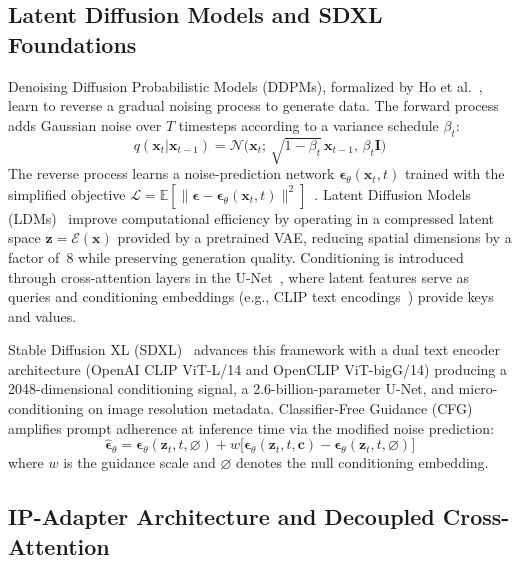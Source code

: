 \documentclass[conference]{IEEEtran}
\newcommand{\sdxl}{SDXL}
\begin{document}
\subsection{Latent Diffusion Models and SDXL Foundations}

Denoising Diffusion Probabilistic Models (DDPMs), formalized by Ho et al.~\cite{ho2020ddpm}, learn to reverse a gradual noising process to generate data. The forward process adds Gaussian noise over \(T\) timesteps according to a variance schedule \(\beta_t\):
\begin{equation}
q(\mathbf{x}_t | \mathbf{x}_{t-1}) = \mathcal{N}\!\bigl(\mathbf{x}_t;\, \sqrt{1 - \beta_t}\, \mathbf{x}_{t-1},\, \beta_t \mathbf{I}\bigr)
\label{eq:forward}
\end{equation}
The reverse process learns a noise-prediction network \(\boldsymbol{\epsilon}_\theta(\mathbf{x}_t, t)\) trained with the simplified objective \(\mathcal{L} = \mathbb{E}[\|\boldsymbol{\epsilon} - \boldsymbol{\epsilon}_\theta(\mathbf{x}_t, t)\|^2]\)~\cite{ho2020ddpm}. Latent Diffusion Models (LDMs)~\cite{rombach2022ldm} improve computational efficiency by operating in a compressed latent space \(\mathbf{z} = \mathcal{E}(\mathbf{x})\) provided by a pretrained VAE, reducing spatial dimensions by a factor of~8 while preserving generation quality. Conditioning is introduced through cross-attention layers in the U-Net~\cite{ronneberger2015unet}, where latent features serve as queries and conditioning embeddings (e.g., CLIP text encodings~\cite{radford2021clip}) provide keys and values.

Stable Diffusion XL (\sdxl{})~\cite{podell2023sdxl} advances this framework with a dual text encoder architecture (OpenAI CLIP ViT-L/14 and OpenCLIP ViT-bigG/14) producing a 2048-dimensional conditioning signal, a 2.6-billion-parameter U-Net, and micro-conditioning on image resolution metadata. Classifier-Free Guidance (CFG)~\cite{ho2022cfg} amplifies prompt adherence at inference time via the modified noise prediction:
\begin{equation}
\hat{\boldsymbol{\epsilon}}_\theta = \boldsymbol{\epsilon}_\theta(\mathbf{z}_t, t, \varnothing) + w \bigl[\boldsymbol{\epsilon}_\theta(\mathbf{z}_t, t, \mathbf{c}) - \boldsymbol{\epsilon}_\theta(\mathbf{z}_t, t, \varnothing)\bigr]
\label{eq:cfg}
\end{equation}
where \(w\) is the guidance scale and \(\varnothing\) denotes the null conditioning embedding.

\subsection{IP-Adapter Architecture and Decoupled Cross-Attention}
\end{document}
